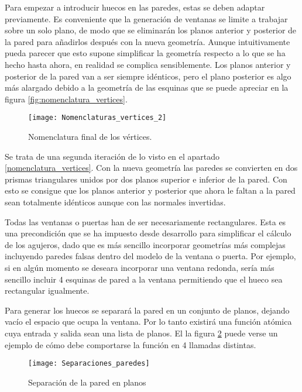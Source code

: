 Para empezar a introducir huecos en las paredes, estas se deben adaptar previamente. Es conveniente que la generación de ventanas se limite a trabajar sobre un solo plano, de modo que se eliminarán los planos anterior y posterior de la pared para añadirlos después con la nueva geometría. Aunque intuitivamente pueda parecer que esto supone simplificar la geometría respecto a lo que se ha hecho hasta ahora, en realidad se complica sensiblemente. Los planos anterior y posterior de la pared van a ser siempre idénticos, pero el plano posterior es algo más alargado debido a la geometría de las esquinas que se puede apreciar en la figura \ref{fig:nomenclatura_vertices}.

\begin{figure}[H]
    \centering
    \texttt{[image: Nomenclaturas\_vertices\_2]}
    \caption{Nomenclatura final de los vértices.}
    \label{fig:nomenclatura_vertices_2}
\end{figure}

Se trata de una segunda iteración de lo visto en el apartado \ref{nomenclatura_vertices}. Con la nueva geometría las paredes se convierten en dos prismas triangulares unidos por dos planos superior e inferior de la pared. Con esto se consigue que los planos anterior y posterior que ahora le faltan a la pared sean totalmente idénticos aunque con las normales invertidas.

Todas las ventanas o puertas han de ser necesariamente rectangulares. Esta es una precondición que se ha impuesto desde desarrollo para simplificar el cálculo de los agujeros, dado que es más sencillo incorporar geometrías más complejas incluyendo paredes falsas dentro del modelo de la ventana o puerta. Por ejemplo, si en algún momento se deseara incorporar una ventana redonda, sería más sencillo incluir 4 esquinas de pared a la ventana permitiendo que el hueco sea rectangular igualmente.

Para generar los huecos se separará la pared en un conjunto de planos, dejando vacío el espacio que ocupa la ventana. Por lo tanto existirá una función atómica cuya entrada y salida sean una lista de planos. El la figura \ref{fig:wall_separacion} puede verse un ejemplo de cómo debe comportarse la función en 4 llamadas distintas.

\begin{figure}[H]
    \centering
    \texttt{[image: Separaciones\_paredes]}
    \caption{Separación de la pared en planos}
    \label{fig:wall_separacion}
\end{figure}

